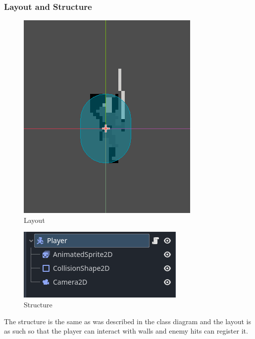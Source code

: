 \documentclass{article}
\begin{document}
        \subsubsection{Layout and Structure}
        \begin{multicols}{2}
                \begin{figure}[H]
                        \centering
                        \includegraphics{images/development/Player_layout.png}
                        \caption{Layout}
                \end{figure}
                \begin{figure}[H]
                        \centering
                        \includegraphics[width = 0.8\columnwidth]{images/development/Player_structure.png}
                        \caption{Structure}
                \end{figure}
        \end{multicols}
        \noindent The structure is the same as was described in the class diagram and the layout is as such so that the player can interact with walls and enemy hits can register it.\\
\end{document}
